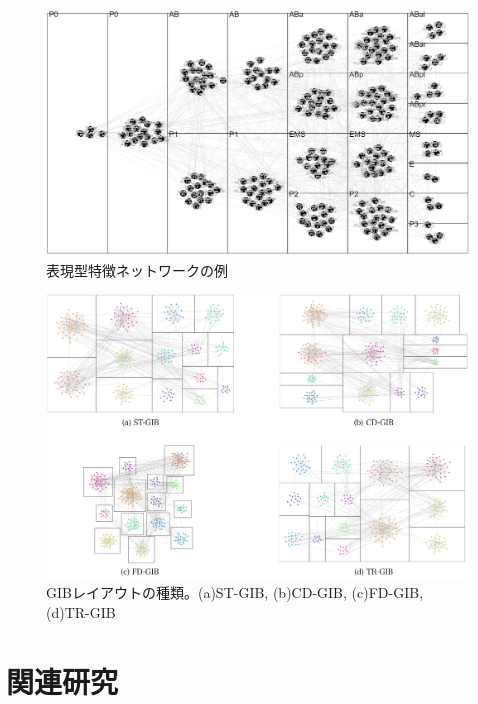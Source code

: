 \documentclass{kuee}
\begin{document}
\begin{figure}
  \centering
  \label{fig:example_phenotype}
  \includegraphics[width=15cm]{./images/PhenotypeNet.png}
  \caption{表現型特徴ネットワークの例}
\end{figure}

\begin{figure}
  \centering
  \label{fig:example_GIB}
  \includegraphics[width=15cm]{./images/examples.png}
  \caption{GIBレイアウトの種類。(a)ST-GIB, (b)CD-GIB, (c)FD-GIB, (d)TR-GIB}
\end{figure}


\chapter{関連研究}
\label{chap:relatedwork}
\end{document}
